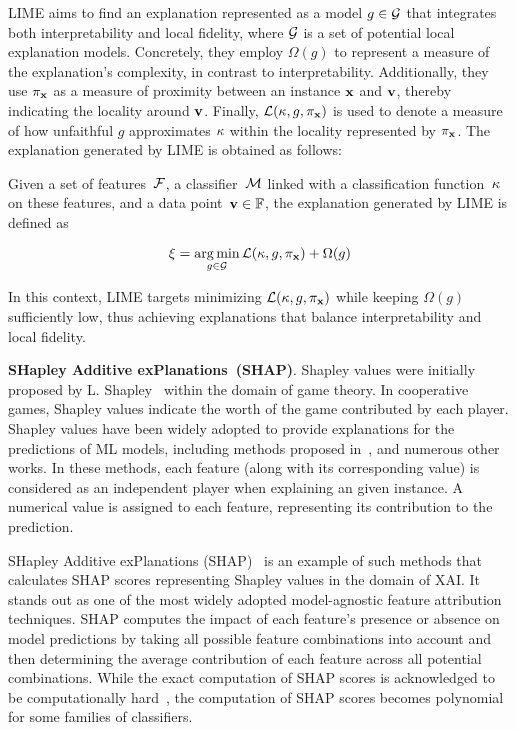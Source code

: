 LIME aims to find an explanation represented as a model $g \in {\mathcal{G}}$ that 
integrates both interpretability and local fidelity, where ${\mathcal{G}}$ is a 
set of potential local explanation models. 
%
Concretely, they employ $\Omega(g)$ to represent a measure of the explanation's 
complexity, in contrast to interpretability.
%
Additionally, they use $\pi_{\mathbf{x}}$ as a measure of proximity between an instance 
$\mathbf{x}$ and $\mathbf{v}$, thereby indicating the locality around $\mathbf{v}$.
%
Finally, ${\mathcal{L}}(\kappa, g, \pi_{\mathbf{x}})$ is used to denote a measure of how unfaithful 
$g$ approximates $\kappa$ within the locality represented by $\pi_{\mathbf{x}}$.
%
The explanation generated by LIME is obtained as follows:

\begin{definition}[LIME] \label{def:lime}
	Given a set of features~${\mathcal{F}}$, a classifier~${\mathcal{M}}$ linked with a classification
	function~$\kappa$ on these features, and a data point~$\mathbf{v} \in \mathbb{F}$,
	the explanation generated by LIME is defined as

	\begin{equation} \label{eq:lime}
		\xi = \operatorname*{arg\,min}_{g \in {\mathcal{G}}} {\mathcal{L}}(\kappa, g, \pi_{\mathbf{x}}) + \Omega(g)
	\end{equation}
\end{definition}

In this context, LIME targets minimizing ${\mathcal{L}}(\kappa, g, \pi_{\mathbf{x}})$ 
while keeping  $\Omega(g)$ sufficiently low,
thus achieving explanations that balance interpretability and local fidelity.

\textbf{SHapley Additive exPlanations~(SHAP)}. %
Shapley values were initially proposed by L. Shapley~\cite{shapley-ctg53,shapley-19}
within the domain of game theory.
%
In cooperative games, Shapley values indicate the worth of the game contributed by each player.
%
Shapley values have been widely adopted to provide explanations for the predictions of ML models, 
including methods proposed in~\cite{sk-jmlr10,sk-kis14,lundberg-nips17}, and numerous other works.
%
In these methods, each feature (along with its corresponding value) is considered as 
an independent player when explaining an given instance.
%
A numerical value is assigned to each feature, representing its contribution to the prediction.

SHapley Additive exPlanations (SHAP)~\cite{lundberg-nips17,molnar-bk20} is an example of such
methods that calculates SHAP scores representing Shapley values in the domain of XAI.
%
It stands out as one of the most widely adopted model-agnostic feature attribution techniques.
%
SHAP computes the impact of each feature's presence or absence on model predictions 
by taking all possible feature combinations into account and 
then determining the average contribution of each feature across all potential combinations.
%
While the exact computation of SHAP scores is acknowledged to be 
computationally hard~\cite{barcelo-aaai21,barcelo-corr21}, 
the computation of SHAP scores becomes polynomial for some families of classifiers.

